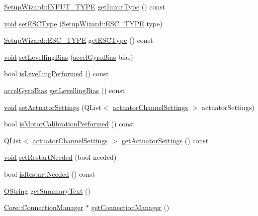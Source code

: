 \begin{DoxyCompactItemize}
\item 
\hyperlink{group___vehicle_configuration_source_gae10edd59d3a32fad8c531a1d2346115c}{\-Setup\-Wizard\-::\-I\-N\-P\-U\-T\-\_\-\-T\-Y\-P\-E} \hyperlink{group___setup_ga8457ec450095eb7b93fd74be5451cac6}{get\-Input\-Type} () const 
\item 
\hyperlink{group___u_a_v_objects_plugin_ga444cf2ff3f0ecbe028adce838d373f5c}{void} \hyperlink{group___setup_ga08e01090d6c906ff75ee8d840bbd9862}{set\-E\-S\-C\-Type} (\hyperlink{group___vehicle_configuration_source_ga734c812e17554d4f7ca67f1008abdd6c}{\-Setup\-Wizard\-::\-E\-S\-C\-\_\-\-T\-Y\-P\-E} type)
\item 
\hyperlink{group___vehicle_configuration_source_ga734c812e17554d4f7ca67f1008abdd6c}{\-Setup\-Wizard\-::\-E\-S\-C\-\_\-\-T\-Y\-P\-E} \hyperlink{group___setup_ga3922ac6f628847018f045d0c60f1ba6b}{get\-E\-S\-C\-Type} () const 
\item 
\hyperlink{group___u_a_v_objects_plugin_ga444cf2ff3f0ecbe028adce838d373f5c}{void} \hyperlink{group___setup_ga04cbfb7730776465a95c22950d048556}{set\-Levelling\-Bias} (\hyperlink{structaccel_gyro_bias}{accel\-Gyro\-Bias} bias)
\item 
bool \hyperlink{group___setup_ga71069ce8994f32f192e40aaa45b51a4a}{is\-Levelling\-Performed} () const 
\item 
\hyperlink{structaccel_gyro_bias}{accel\-Gyro\-Bias} \hyperlink{group___setup_ga2e280373fdc65c0cb8c5520855eadbef}{get\-Levelling\-Bias} () const 
\item 
\hyperlink{group___u_a_v_objects_plugin_ga444cf2ff3f0ecbe028adce838d373f5c}{void} \hyperlink{group___setup_gadf481b176ca83f64ec53b8479220abec}{set\-Actuator\-Settings} (\-Q\-List$<$ \hyperlink{structactuator_channel_settings}{actuator\-Channel\-Settings} $>$ actuator\-Settings)
\item 
bool \hyperlink{group___setup_ga98d902dbc91dfbd4c88f9adbc6f57e89}{is\-Motor\-Calibration\-Performed} () const 
\item 
\-Q\-List$<$ \hyperlink{structactuator_channel_settings}{actuator\-Channel\-Settings} $>$ \hyperlink{group___setup_ga47a0be6b075d0075a7ae935c7fe5deed}{get\-Actuator\-Settings} () const 
\item 
\hyperlink{group___u_a_v_objects_plugin_ga444cf2ff3f0ecbe028adce838d373f5c}{void} \hyperlink{group___setup_ga4e9d50c7eb26a93d5ba6edc45213e071}{set\-Restart\-Needed} (bool needed)
\item 
bool \hyperlink{group___setup_ga882149361d85310b21ac7b62e5fa0abd}{is\-Restart\-Needed} () const 
\item 
\hyperlink{group___u_a_v_objects_plugin_gab9d252f49c333c94a72f97ce3105a32d}{\-Q\-String} \hyperlink{group___setup_gaf9b2ce464fc2b73f43f648e68a274676}{get\-Summary\-Text} ()
\item 
\hyperlink{class_core_1_1_connection_manager}{\-Core\-::\-Connection\-Manager} $\ast$ \hyperlink{group___setup_gadf5243c8122542982d190277812b885b}{get\-Connection\-Manager} ()
\end{DoxyCompactItemize}



